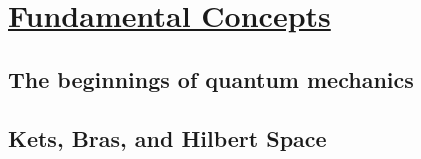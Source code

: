 \section[Fundamental Concepts]{\hyperlink{toc}{Fundamental Concepts}}
\subsection{The beginnings of quantum mechanics}

\subsection{Kets, Bras, and Hilbert Space}
